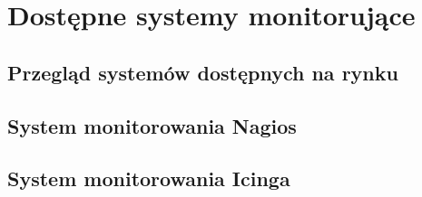 \chapter{Dostępne systemy monitorujące}

\section[Przegląd systemów][Przegląd systemów dostępnych na rynku]{Przegląd systemów dostępnych na rynku}

\section[Nagios][System monitorowania Nagios]{System monitorowania Nagios}

\section[Icinga][System monitorowania Icinga]{System monitorowania Icinga}



